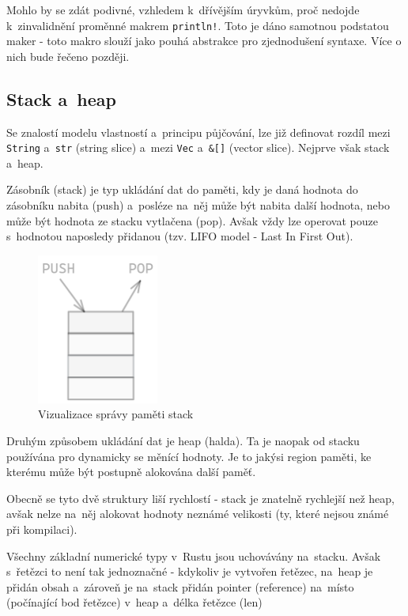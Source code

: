 \documentclass[a4paper, 12pt]{article} %
\newcommand{\rust}[1]{\texttt{#1}}
\begin{document}
			Mohlo by se zdát podivné, vzhledem k~dřívějším úryvkům, proč nedojde k~zinvalidnění proměnné makrem \rust{println!}. Toto je dáno samotnou podstatou maker - toto makro slouží jako pouhá abstrakce pro zjednodušení syntaxe. Více o nich bude řečeno později.
			
		\subsection{Stack a~heap}
			Se znalostí modelu vlastností a~principu půjčování, lze již definovat rozdíl mezi \rust{String} a~\rust{str} (string slice) a~mezi \rust{Vec} a~\rust{&[]} (vector slice). Nejprve však stack a~heap.
				
			Zásobník (stack) je typ ukládání dat do paměti, kdy je daná hodnota do zásobníku nabita (push) a~posléze na~něj může být nabita další hodnota, nebo může být hodnota ze stacku vytlačena (pop). Avšak vždy lze operovat pouze s~hodnotou naposledy přidanou (tzv. LIFO model - Last In First Out).
			\begin{center}
				\begin{figure}[H]
					\centering
					\includegraphics[width=4cm]{stack}
					\caption{Vizualizace správy paměti stack}
					\label{fig:my_label_2}
				\end{figure}
			\end{center}
				
			Druhým způsobem ukládání dat je heap (halda). Ta je naopak od stacku používána pro dynamicky se měnící hodnoty. Je to jakýsi region paměti, ke kterému může být postupně alokována další paměť.
				
			Obecně se tyto dvě struktury liší rychlostí - stack je znatelně rychlejší než heap, avšak nelze na~něj alokovat hodnoty neznámé velikosti (ty, které nejsou známé při kompilaci).
				
			Všechny základní numerické typy v~Rustu jsou uchovávány na~stacku. Avšak s~řetězci to není tak jednoznačné - kdykoliv je vytvořen řetězec, na~heap je přidán obsah a~zároveň je na~stack přidán pointer (reference) na~místo (počínající bod řetězce) v~heap a~délka řetězce (len)
				
\end{document}

